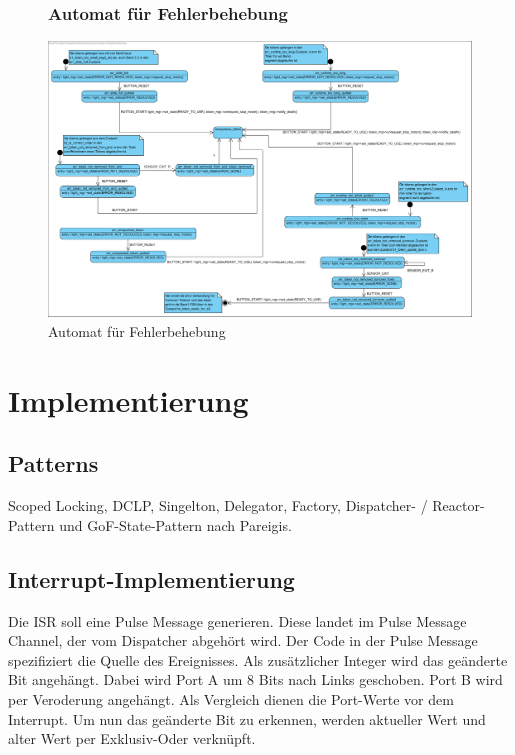 \documentclass[oneside,a4paper,titlepage]{scrartcl} %
\begin{document}
\begin{figure}
    \subsubsection{Automat für Fehlerbehebung}
    \centering\vfill\includegraphics[angle=90,scale=0.54]{imgs/Error_FSM.png}
    \caption{Automat für Fehlerbehebung}
\end{figure}

\newpage

\section{Implementierung}

\subsection{Patterns}
Scoped Locking, DCLP, Singelton, Delegator, Factory, Dispatcher- / Reactor-Pattern und GoF-State-Pattern nach Pareigis.

\subsection{Interrupt-Implementierung}
Die ISR soll eine Pulse Message generieren. Diese landet im Pulse Message Channel, der vom Dispatcher abgehört wird.
Der Code in der Pulse Message spezifiziert die Quelle des Ereignisses. Als zusätzlicher Integer wird das geänderte Bit angehängt. Dabei wird Port A um 8 Bits nach Links geschoben. Port B wird per Veroderung angehängt. Als Vergleich dienen die Port-Werte vor dem Interrupt. Um nun das geänderte Bit zu erkennen, werden aktueller Wert und alter Wert per Exklusiv-Oder verknüpft.
\newpage
\end{document}
